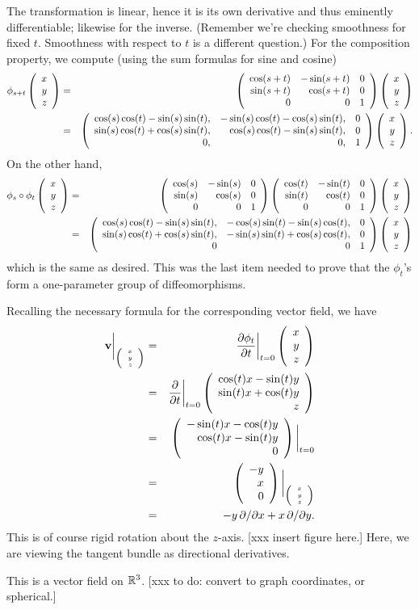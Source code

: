 \documentclass[10pt]{article}
\numberwithin{equation}{subsection}
\begin{document}
The transformation is linear, hence it is its own derivative and thus eminently
differentiable; likewise for the inverse.  (Remember we're checking smoothness
for fixed $t$.  Smoothness with respect to $t$ is a different question.) For
the composition property, we compute (using the sum formulas for sine and
cosine)
\begin{eqnarray*}
	\phi_{s+t}
	\left(\begin{array}{r} x \\ y \\ z\end{array}\right)
	&=&
	\left(\begin{array}{rrr} \cos(s+t) & -\sin(s+t) & 0 \\ \sin(s+t) &  \cos(s+t) & 0 \\ 0 & 0 & 1 \\ \end{array}\right)
	\left(\begin{array}{r} x \\ y \\ z\end{array}\right) \\
	&=&
	\left(\begin{array}{rrr} \cos(s)\cos(t)-\sin(s)\sin(t), & -\sin(s)\cos(t)-\cos(s)\sin(t), & 0 \\ \sin(s)\cos(t)+\cos(s)\sin(t), &  \cos(s)\cos(t)-\sin(s)\sin(t), & 0 \\ 0, & 0, & 1 \\ \end{array}\right)
	\left(\begin{array}{r} x \\ y \\ z\end{array}\right).
\end{eqnarray*}
On the other hand,
\begin{eqnarray*}
	\phi_s\circ\phi_t
	\left(\begin{array}{r} x \\ y \\ z\end{array}\right)
	&=&
	\left(\begin{array}{rrr} \cos(s) & -\sin(s) & 0 \\ \sin(s) &  \cos(s) & 0 \\ 0 & 0 & 1 \\ \end{array}\right)
	\left(\begin{array}{rrr} \cos(t) & -\sin(t) & 0 \\ \sin(t) &  \cos(t) & 0 \\ 0 & 0 & 1 \\ \end{array}\right)
	\left(\begin{array}{r} x \\ y \\ z\end{array}\right) \\
	&=&
	\left(\begin{array}{rrr} \cos(s) \cos(t)-\sin(s)\sin(t), & -\cos(s)\sin(t)-\sin(s)\cos(t), & 0 \\ \sin(s) \cos(t)+\cos(s)\sin(t), & -\sin(s)\sin(t)+\cos(s)\cos(t), & 0 \\ 0 & 0 & 1 \\ \end{array}\right)
	\left(\begin{array}{r} x \\ y \\ z\end{array}\right)
\end{eqnarray*}
which is the same as desired.  This was the last item needed to prove
that the $\phi_t$'s form a one-parameter group of diffeomorphisms.

Recalling the necessary formula for the corresponding vector field, we have
\begin{eqnarray*}
	\mathbf{v}\bigg|_{\tiny{\left(\begin{array}{r} x \\ y \\ z\end{array}\right)}}
	&=& \frac{\partial \phi_t}{\partial t}\bigg|_{\tiny{t=0}}\left(\begin{array}{r} x \\ y \\ z\end{array}\right) \\
	&=& \frac{\partial }{\partial t}\bigg|_{\tiny{t=0}}
		\left(\begin{array}{r} \cos(t)x - \sin(t) y \\ \sin(t)x + \cos(t) y \\ z\end{array}\right) \\
	&=& \left(\begin{array}{r} -\sin(t)x - \cos(t) y \\ \cos(t)x - \sin(t) y \\ 0\end{array}\right)
		\bigg|_{\tiny{t=0}} \\
	&=& \left(\begin{array}{r} -y \\ x \\ 0\end{array}\right)\bigg|_{\tiny{\left(\begin{array}{r} x \\ y \\ z\end{array}\right)}} \\
	&=& -y\,\partial/\partial x + x\,\partial/\partial y.
\end{eqnarray*}
This is of course rigid rotation about the $z$-axis.  [xxx insert figure here.]
Here, we are viewing the tangent bundle as directional derivatives.

This is a vector field on $\mathbb{R}^3$.  [xxx to do:  convert to graph coordinates, or spherical.]
\end{document}
